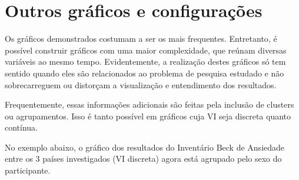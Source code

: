 \documentclass[
]{book}
\newenvironment{Shaded}{\begin{snugshade}}{\end{snugshade}}
\newcommand{\DataTypeTok}[1]{\textcolor[rgb]{0.13,0.29,0.53}{#1}}
\newcommand{\FloatTok}[1]{\textcolor[rgb]{0.00,0.00,0.81}{#1}}
\newcommand{\KeywordTok}[1]{\textcolor[rgb]{0.13,0.29,0.53}{\textbf{#1}}}
\newcommand{\NormalTok}[1]{#1}
\newcommand{\OperatorTok}[1]{\textcolor[rgb]{0.81,0.36,0.00}{\textbf{#1}}}
\newcommand{\StringTok}[1]{\textcolor[rgb]{0.31,0.60,0.02}{#1}}
\begin{document}
\hypertarget{outros-gruxe1ficos-e-configurauxe7uxf5es}{%
\section{Outros gráficos e configurações}\label{outros-gruxe1ficos-e-configurauxe7uxf5es}}

Os gráficos demonstrados costumam a ser os mais frequentes. Entretanto, é possível construir gráficos com uma maior complexidade, que reúnam diversas variáveis ao mesmo tempo. Evidentemente, a realização destes gráficos só tem sentido quando eles são relacionados ao problema de pesquisa estudado e não sobrecarreguem ou distorçam a visualização e entendimento dos resultados.

Frequentemente, essas informações adicionais são feitas pela inclusão de clusters ou agrupamentos. Isso é tanto possível em gráficos cuja VI seja discreta quanto contínua.

No exemplo abaixo, o gráfico dos resultados do Inventário Beck de Ansiedade entre os 3 países investigados (VI discreta) agora está agrupado pelo sexo do participante.

\begin{Shaded}
\end{Shaded}
\end{document}

